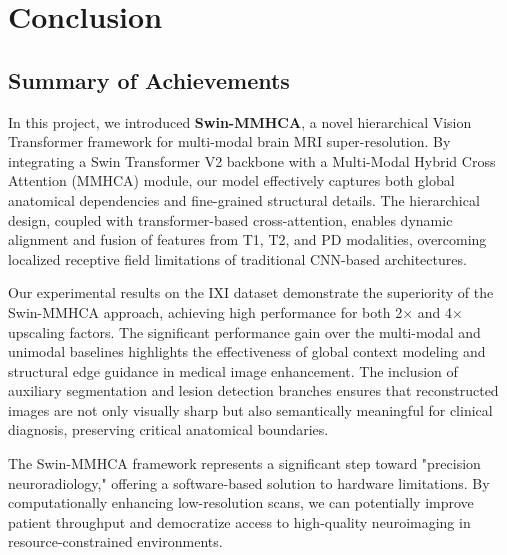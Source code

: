 \chapter{Conclusion}

\section{Summary of Achievements}
In this project, we introduced \textbf{Swin-MMHCA}, a novel hierarchical Vision Transformer framework for multi-modal brain MRI super-resolution. By integrating a Swin Transformer V2 backbone with a Multi-Modal Hybrid Cross Attention (MMHCA) module, our model effectively captures both global anatomical dependencies and fine-grained structural details. The hierarchical design, coupled with transformer-based cross-attention, enables dynamic alignment and fusion of features from T1, T2, and PD modalities, overcoming localized receptive field limitations of traditional CNN-based architectures.

Our experimental results on the IXI dataset demonstrate the superiority of the Swin-MMHCA approach, achieving high performance for both 2$\times$ and 4$\times$ upscaling factors. The significant performance gain over the multi-modal and unimodal baselines highlights the effectiveness of global context modeling and structural edge guidance in medical image enhancement. The inclusion of auxiliary segmentation and lesion detection branches ensures that reconstructed images are not only visually sharp but also semantically meaningful for clinical diagnosis, preserving critical anatomical boundaries.

The Swin-MMHCA framework represents a significant step toward "precision neuroradiology," offering a software-based solution to hardware limitations. By computationally enhancing low-resolution scans, we can potentially improve patient throughput and democratize access to high-quality neuroimaging in resource-constrained environments.

